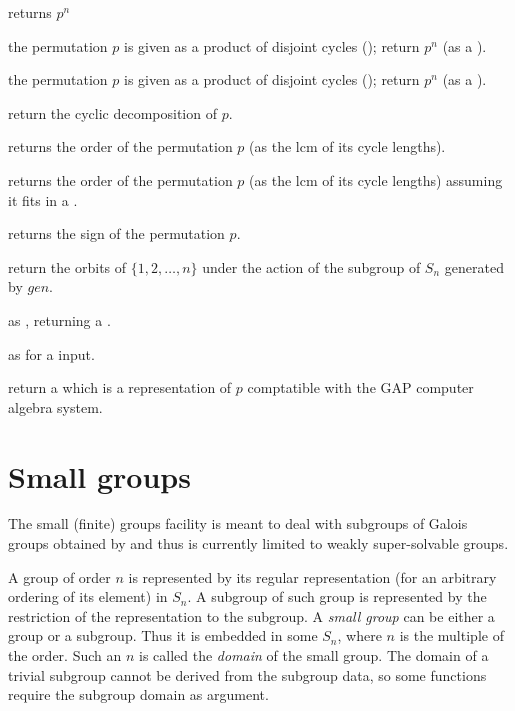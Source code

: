  returns $p^n$

 the permutation $p$ is given as
a product of disjoint cycles (); return $p^n$ (as a ).

 the permutation $p$ is given as
a product of disjoint cycles (); return $p^n$ (as a ).

 return the cyclic decomposition of $p$.

 returns the order of the permutation $p$
(as the lcm of its cycle lengths).

 returns the order of the permutation $p$
(as the lcm of its cycle lengths) assuming it fits in a .

 returns the sign of the permutation $p$.

 return the orbits of
$\{1,2,\ldots,n\}$ under the action of the subgroup of $S_n$ generated by
$gen$.

 as , returning a
.

 as  for a  input.

 return a  which is a representation
of $p$ comptatible with the GAP computer algebra system.

\section{Small groups}

The small (finite) groups facility is meant to deal with subgroups of Galois
groups obtained by  and thus is currently limited to weakly
super-solvable groups.

A group  of order $n$ is represented by its regular representation
(for an arbitrary ordering of its element) in $S_n$.  A subgroup of such group
is represented by the restriction of the representation to the subgroup.
A \emph{small group} can be either a group or a subgroup. Thus it is embedded
in some $S_n$, where $n$ is the multiple of the order. Such an $n$ is called
the \emph{domain} of the small group. The domain of a trivial subgroup cannot
be derived from the subgroup data, so some functions require the subgroup
domain as argument.

